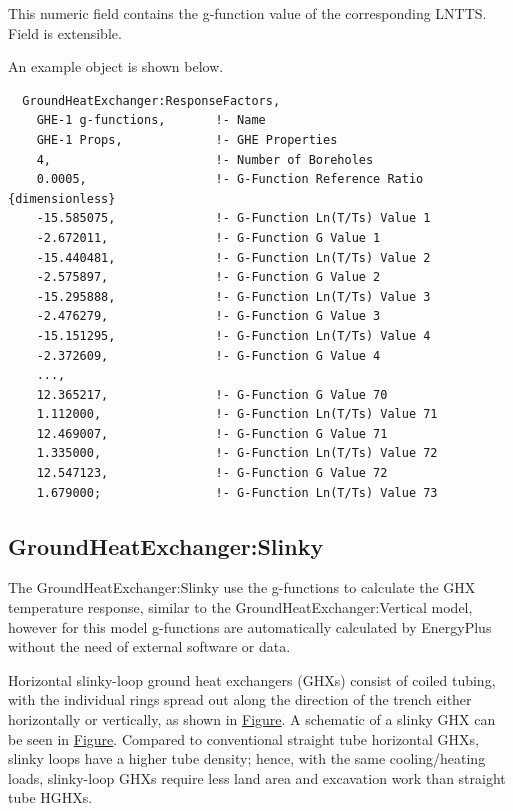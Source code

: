 This numeric field contains the g-function value of the corresponding LNTTS. Field is extensible.

An example object is shown below.

\begin{lstlisting}
  GroundHeatExchanger:ResponseFactors,
    GHE-1 g-functions,       !- Name
    GHE-1 Props,             !- GHE Properties
    4,                       !- Number of Boreholes
    0.0005,                  !- G-Function Reference Ratio {dimensionless}
    -15.585075,              !- G-Function Ln(T/Ts) Value 1
    -2.672011,               !- G-Function G Value 1
    -15.440481,              !- G-Function Ln(T/Ts) Value 2
    -2.575897,               !- G-Function G Value 2
    -15.295888,              !- G-Function Ln(T/Ts) Value 3
    -2.476279,               !- G-Function G Value 3
    -15.151295,              !- G-Function Ln(T/Ts) Value 4
    -2.372609,               !- G-Function G Value 4
    ...,
    12.365217,               !- G-Function G Value 70
    1.112000,                !- G-Function Ln(T/Ts) Value 71
    12.469007,               !- G-Function G Value 71
    1.335000,                !- G-Function Ln(T/Ts) Value 72
    12.547123,               !- G-Function G Value 72
    1.679000;                !- G-Function Ln(T/Ts) Value 73
\end{lstlisting}

\subsection{GroundHeatExchanger:Slinky}\label{groundheatexchangerslinky}

The GroundHeatExchanger:Slinky use the g-functions to calculate the GHX temperature response, similar to the GroundHeatExchanger:Vertical model, however for this model g-functions are automatically calculated by EnergyPlus without the need of external software or data.

Horizontal slinky-loop ground heat exchangers (GHXs) consist of coiled tubing, with the individual rings spread out along the direction of the trench either horizontally or vertically, as shown in \protect\hyperlink{SlinkyIOFig1}{Figure}. A schematic of a slinky GHX can be seen in \protect\hyperlink{SlinkyIOFig2}{Figure}. Compared to conventional straight tube horizontal GHXs, slinky loops have a higher tube density; hence, with the same cooling/heating loads, slinky-loop GHXs require less land area and excavation work than straight tube HGHXs.

